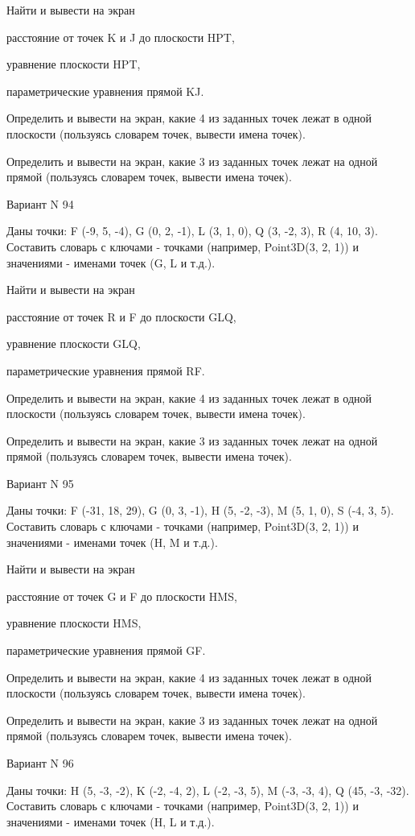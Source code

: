 \documentclass[11pt]{report}
\begin{document}
 
Найти и вывести на экран


расстояние от точек K и J до плоскости HPT,

 
уравнение плоскости HPT,

 
параметрические уравнения прямой KJ.


Определить и вывести на экран, какие 4 из заданных точек лежат в одной плоскости (пользуясь словарем точек, вывести имена точек).


Определить и вывести на экран, какие 3 из заданных точек лежат на одной прямой (пользуясь словарем точек, вывести имена точек).

Вариант N 94

Даны точки: F (-9, 5, -4), G (0, 2, -1), L (3, 1, 0), Q (3, -2, 3), R (4, 10, 3).
Составить словарь с ключами - точками (например, Point3D(3, 2, 1)) и значениями - именами точек (G, L и т.д.).

 
Найти и вывести на экран


расстояние от точек R и F до плоскости GLQ,

 
уравнение плоскости GLQ,

 
параметрические уравнения прямой RF.


Определить и вывести на экран, какие 4 из заданных точек лежат в одной плоскости (пользуясь словарем точек, вывести имена точек).


Определить и вывести на экран, какие 3 из заданных точек лежат на одной прямой (пользуясь словарем точек, вывести имена точек).

Вариант N 95

Даны точки: F (-31, 18, 29), G (0, 3, -1), H (5, -2, -3), M (5, 1, 0), S (-4, 3, 5).
Составить словарь с ключами - точками (например, Point3D(3, 2, 1)) и значениями - именами точек (H, M и т.д.).

 
Найти и вывести на экран


расстояние от точек G и F до плоскости HMS,

 
уравнение плоскости HMS,

 
параметрические уравнения прямой GF.


Определить и вывести на экран, какие 4 из заданных точек лежат в одной плоскости (пользуясь словарем точек, вывести имена точек).


Определить и вывести на экран, какие 3 из заданных точек лежат на одной прямой (пользуясь словарем точек, вывести имена точек).

Вариант N 96

Даны точки: H (5, -3, -2), K (-2, -4, 2), L (-2, -3, 5), M (-3, -3, 4), Q (45, -3, -32).
Составить словарь с ключами - точками (например, Point3D(3, 2, 1)) и значениями - именами точек (H, L и т.д.).
\end{document}
